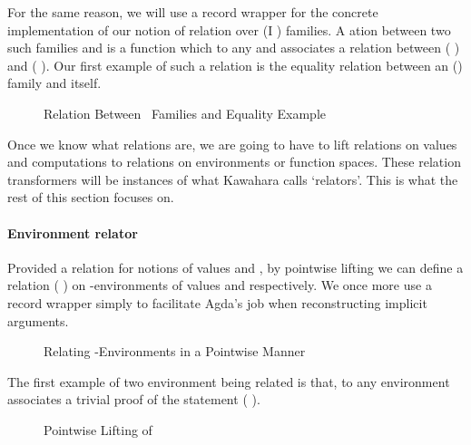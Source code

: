 For the same reason, we will use a record wrapper for the concrete
implementation of our notion of relation over (I )
families. A ation between two such families  and 
is a function which to any  and  associates a relation
between (  ) and (  ). Our first
example of such a relation is  the equality relation between
an () family  and itself.

\begin{figure}[h]
\begin{minipage}[t]{0.65\textwidth}
\end{minipage}
\begin{minipage}[t]{0.25\textwidth}
\end{minipage}
\caption{Relation Between ~Families and Equality Example\label{ex:fam-eq}}
\label{fig:reldef}
\end{figure}

Once we know what relations are, we are going to have to lift relations on values
and computations to relations on environments or  function spaces.
These relation
transformers will be instances of what Kawahara calls `relators'.
This is what the rest of this section focuses on.


\paragraph{Environment relator}
Provided a relation  for notions of values  and , by
pointwise lifting we can define a relation {(  )} on
-environments of values  and  respectively. We once more
use a record wrapper simply to facilitate Agda's job when reconstructing
implicit arguments.

\begin{figure}[h]
  \caption{Relating -Environments in a Pointwise Manner
    \label{defn:Env-rel}}
\end{figure}

The first example of two environment being related is  that, to any
environment  associates a trivial proof of the statement
{(    )}.

\begin{figure}[h]
\caption{Pointwise Lifting of \label{defn:reflR}}
\end{figure}

